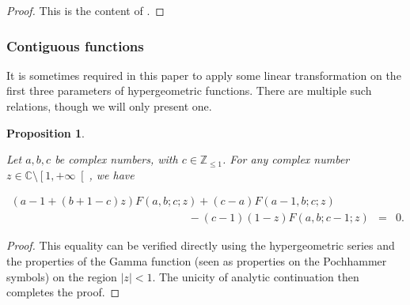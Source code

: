 \documentclass{jams-l}
\newtheorem{proposition}[theorem]{Proposition}
\theoremstyle{definition}
\theoremstyle{remark}
\numberwithin{equation}{section}
\begin{document}
            \begin{proof}
            
                This is the content of \cite[Sec. 5.9.5]{MR1429619}.
            
            \end{proof}
        
        
        \subsubsection{Contiguous functions}
        
            It is sometimes required in this paper to apply some linear transformation on the first three parameters of hypergeometric functions. There are multiple such relations, though we will only present one.
        
            \begin{proposition}
            \label{PropContiguousFunctions}
        
                Let $a,b,c$ be complex numbers, with $c \in \mathbb{Z}_{\leqslant 1}$. For any complex number $z \in \mathbb{C} \setminus \left[ 1, + \infty \right[$, we have
                
                \[ \begin{array}{lll}
                        \left( a - 1 + \left( b + 1 - c \right) z \right) F \left( a, b; c; z \right) + \left( c - a \right) F \left( a - 1, b; c; z \right) \\[0.5em]
                        
                        \qquad \qquad \qquad \qquad \qquad \qquad \qquad \qquad - \left( c - 1 \right) \left( 1 - z \right) F \left( a, b; c-1; z \right) & = & 0.
                    \end{array} \]
        
            \end{proposition}
            
            \begin{proof}
            
                This equality can be verified directly using the hypergeometric series and the properties of the Gamma function (seen as properties on the Pochhammer symbols) on the region $\left \vert z \right \vert < 1$. The unicity of analytic continuation then completes the proof.
            
            \end{proof}
            
\end{document}
